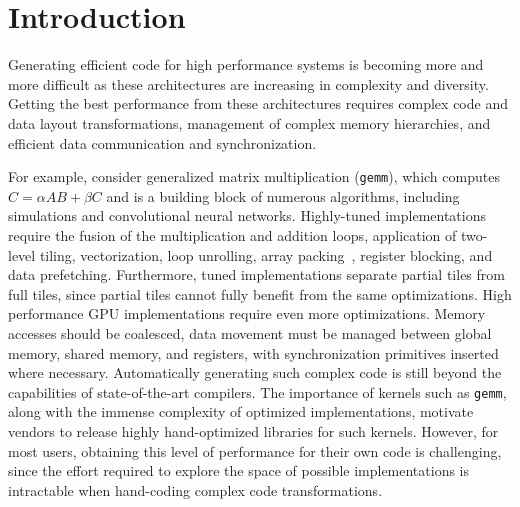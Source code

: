 \vspace{-0.25cm}
\section{Introduction}
\label{sec:intro}

Generating efficient code for high performance systems is becoming more and more difficult as these architectures are increasing in complexity and diversity.
Getting the best performance from these architectures requires complex code and data layout transformations, management of complex memory hierarchies, and efficient data communication and synchronization.

For example, consider generalized matrix multiplication (\texttt{gemm}), which computes $C = \alpha AB + \beta C$ and is a
building block of numerous algorithms, including simulations and convolutional neural networks.  Highly-tuned implementations
require the fusion of the multiplication and addition loops, application of two-level tiling, vectorization, loop unrolling, array packing~\cite{Goto:2008:AHM:1356052.1356053},
register blocking, and data prefetching.  Furthermore, tuned implementations separate partial tiles from full tiles, since partial tiles cannot fully benefit from the same optimizations.
High performance GPU implementations require even more optimizations.  Memory accesses should be coalesced, data movement must be managed between global memory, shared memory, and registers, with synchronization primitives inserted where necessary.
Automatically generating such complex code is still beyond the capabilities of state-of-the-art compilers.
The importance of kernels such as \texttt{gemm}, along with the immense complexity of optimized implementations, motivate vendors to release highly hand-optimized libraries for such kernels.  However, for most users, obtaining this level of performance for their own code is challenging, since the effort required to explore the space of possible implementations is intractable when hand-coding complex code transformations.

